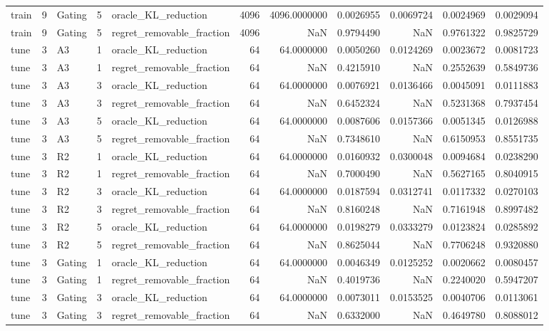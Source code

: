 \begin{tabular}{lrlrlrrrrrr}
train & 9 & Gating & 5 & oracle_KL_reduction & 4096 & 4096.0000000 & 0.0026955 & 0.0069724 & 0.0024969 & 0.0029094 \\
train & 9 & Gating & 5 & regret_removable_fraction & 4096 & NaN & 0.9794490 & NaN & 0.9761322 & 0.9825729 \\
tune & 3 & A3 & 1 & oracle_KL_reduction & 64 & 64.0000000 & 0.0050260 & 0.0124269 & 0.0023672 & 0.0081723 \\
tune & 3 & A3 & 1 & regret_removable_fraction & 64 & NaN & 0.4215910 & NaN & 0.2552639 & 0.5849736 \\
tune & 3 & A3 & 3 & oracle_KL_reduction & 64 & 64.0000000 & 0.0076921 & 0.0136466 & 0.0045091 & 0.0111883 \\
tune & 3 & A3 & 3 & regret_removable_fraction & 64 & NaN & 0.6452324 & NaN & 0.5231368 & 0.7937454 \\
tune & 3 & A3 & 5 & oracle_KL_reduction & 64 & 64.0000000 & 0.0087606 & 0.0157366 & 0.0051345 & 0.0126988 \\
tune & 3 & A3 & 5 & regret_removable_fraction & 64 & NaN & 0.7348610 & NaN & 0.6150953 & 0.8551735 \\
tune & 3 & R2 & 1 & oracle_KL_reduction & 64 & 64.0000000 & 0.0160932 & 0.0300048 & 0.0094684 & 0.0238290 \\
tune & 3 & R2 & 1 & regret_removable_fraction & 64 & NaN & 0.7000490 & NaN & 0.5627165 & 0.8040915 \\
tune & 3 & R2 & 3 & oracle_KL_reduction & 64 & 64.0000000 & 0.0187594 & 0.0312741 & 0.0117332 & 0.0270103 \\
tune & 3 & R2 & 3 & regret_removable_fraction & 64 & NaN & 0.8160248 & NaN & 0.7161948 & 0.8997482 \\
tune & 3 & R2 & 5 & oracle_KL_reduction & 64 & 64.0000000 & 0.0198279 & 0.0333279 & 0.0123824 & 0.0285892 \\
tune & 3 & R2 & 5 & regret_removable_fraction & 64 & NaN & 0.8625044 & NaN & 0.7706248 & 0.9320880 \\
tune & 3 & Gating & 1 & oracle_KL_reduction & 64 & 64.0000000 & 0.0046349 & 0.0125252 & 0.0020662 & 0.0080457 \\
tune & 3 & Gating & 1 & regret_removable_fraction & 64 & NaN & 0.4019736 & NaN & 0.2240020 & 0.5947207 \\
tune & 3 & Gating & 3 & oracle_KL_reduction & 64 & 64.0000000 & 0.0073011 & 0.0153525 & 0.0040706 & 0.0113061 \\
tune & 3 & Gating & 3 & regret_removable_fraction & 64 & NaN & 0.6332000 & NaN & 0.4649780 & 0.8088012 \\

\end{tabular}
